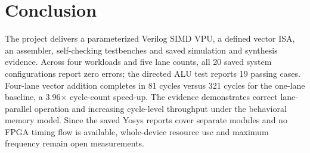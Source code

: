\documentclass[conference]{IEEEtran}
\begin{document}
\section{Conclusion}
The project delivers a parameterized Verilog SIMD VPU, a defined vector ISA, an assembler, self-checking testbenches and saved simulation and synthesis evidence. Across four workloads and five lane counts, all 20 saved system configurations report zero errors; the directed ALU test reports 19 passing cases. Four-lane vector addition completes in 81 cycles versus 321 cycles for the one-lane baseline, a 3.96$\times$ cycle-count speed-up. The evidence demonstrates correct lane-parallel operation and increasing cycle-level throughput under the behavioral memory model. Since the saved Yosys reports cover separate modules and no FPGA timing flow is available, whole-device resource use and maximum frequency remain open measurements.



\end{document}
